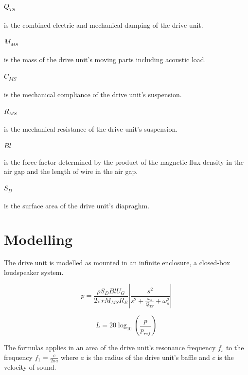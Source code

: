 \paragraph{$Q_{TS}$} is the combined electric and mechanical damping of the drive unit.

\paragraph{$M_{MS}$} is the mass of the drive unit's moving parts including acoustic load.

\paragraph{$C_{MS}$} is the mechanical compliance of the drive unit's suspension.

\paragraph{$R_{MS}$} is the mechanical resistance of the drive unit's suspension.

\paragraph{$Bl$} is the force factor determined by the product of the magnetic flux density in the air gap and the length of wire in the air gap.

\paragraph{$S_D$} is the surface area of the drive unit's diapraghm.

\section{Modelling}
The drive unit is modelled as mounted in an infinite enclosure, a closed-box loudspeaker system. 

\begin{equation}
p = \frac{\rho S_D B l U_G}{2\pi r M_{MS} R_E}\left|\frac{s^2}{s^2 + \frac{\omega_s}{Q_{TS}}+\omega_s^2}\right|
\label{eq:transdriveunit}
\end{equation}

\begin{equation}
L=20\log_{10}\left(\frac{p}{p_{ref}}\right)
\label{eq:soundpressure}
\end{equation}

The formulas applies in an area of the drive unit's resonance frequency $f_s$ to the frequency $f_1=\frac{c}{2\pi a}$ where $a$ is the radius of the drive unit's baffle and $c$ is the velocity of sound.\cite[p.~41]{Elektroakustik}

